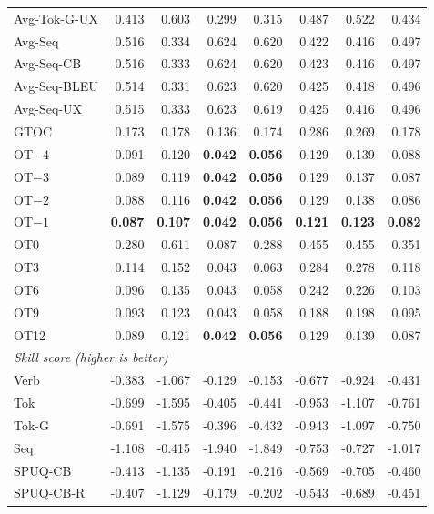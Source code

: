 {\begin{longtable}{@{}lrrrrrrr@{}}
Avg-Tok-G-UX & 0.413 & 0.603 & 0.299 & 0.315 & 0.487 & 0.522 & 0.434 \\
\addlinespace
Avg-Seq & 0.516 & 0.334 & 0.624 & 0.620 & 0.422 & 0.416 & 0.497 \\
Avg-Seq-CB & 0.516 & 0.333 & 0.624 & 0.620 & 0.423 & 0.416 & 0.497 \\
Avg-Seq-BLEU & 0.514 & 0.331 & 0.623 & 0.620 & 0.425 & 0.418 & 0.496 \\
Avg-Seq-UX & 0.515 & 0.333 & 0.623 & 0.619 & 0.425 & 0.416 & 0.496 \\
\addlinespace
GTOC & 0.173 & 0.178 & 0.136 & 0.174 & 0.286 & 0.269 & 0.178 \\
\addlinespace
OT$-4$ & 0.091 & 0.120 & \textbf{0.042} & \textbf{0.056} & 0.129 & 0.139 & 0.088 \\
OT$-3$ & 0.089 & 0.119 & \textbf{0.042} & \textbf{0.056} & 0.129 & 0.137 & 0.087 \\
OT$-2$ & 0.088 & 0.116 & \textbf{0.042} & \textbf{0.056} & 0.129 & 0.138 & 0.086 \\
OT$-1$ & \textbf{0.087} & \textbf{0.107} & \textbf{0.042} & \textbf{0.056} & \textbf{0.121} & \textbf{0.123} & \textbf{0.082} \\
OT0 & 0.280 & 0.611 & 0.087 & 0.288 & 0.455 & 0.455 & 0.351 \\
OT3 & 0.114 & 0.152 & 0.043 & 0.063 & 0.284 & 0.278 & 0.118 \\
OT6 & 0.096 & 0.135 & 0.043 & 0.058 & 0.242 & 0.226 & 0.103 \\
OT9 & 0.093 & 0.123 & 0.043 & 0.058 & 0.188 & 0.198 & 0.095 \\
OT12 & 0.089 & 0.121 & \textbf{0.042} & \textbf{0.056} & 0.129 & 0.139 & 0.087 \\
\midrule
\multicolumn{8}{l}{\textit{Skill score (higher is better)}} \\
\midrule
Verb & -0.383 & -1.067 & -0.129 & -0.153 & -0.677 & -0.924 & -0.431 \\
\addlinespace
Tok & -0.699 & -1.595 & -0.405 & -0.441 & -0.953 & -1.107 & -0.761 \\
Tok-G & -0.691 & -1.575 & -0.396 & -0.432 & -0.943 & -1.097 & -0.750 \\
\addlinespace
Seq & -1.108 & -0.415 & -1.940 & -1.849 & -0.753 & -0.727 & -1.017 \\
\addlinespace
SPUQ-CB & -0.413 & -1.135 & -0.191 & -0.216 & -0.569 & -0.705 & -0.460 \\
SPUQ-CB-R & -0.407 & -1.129 & -0.179 & -0.202 & -0.543 & -0.689 & -0.451 \\

\end{longtable}}
